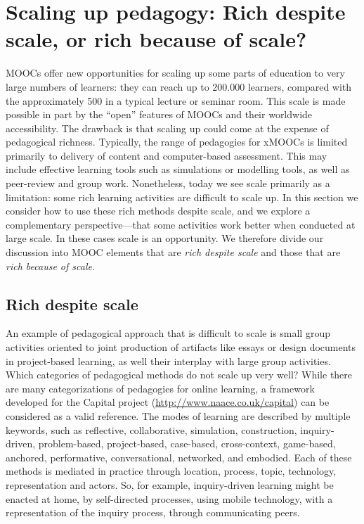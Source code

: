 \section{Scaling up pedagogy: Rich despite scale, or rich because of scale?}


MOOCs offer new opportunities for scaling up some parts of education to very large
numbers of learners:
they can reach up to 200.000 learners, compared with the approximately
500 in a typical lecture or seminar room.
This scale is made possible
in part by the ``open'' features of MOOCs and their worldwide
accessibility.
The drawback is that scaling up could come at the
expense of pedagogical richness. Typically, the range of pedagogies for
xMOOCs is limited primarily to delivery of content and computer-based
assessment. This may include effective learning tools such as
simulations or modelling tools, as well as peer-review and group
work. Nonetheless, today we see scale primarily as a limitation: some
rich learning 
activities are difficult to scale up. In this section we consider
how to use these rich methods despite scale, and we explore a
complementary perspective---that some activities work better when conducted at
large scale. In these cases scale is an opportunity.  We therefore
divide our discussion into MOOC elements that are \emph{rich despite
  scale} and those that are \emph{rich because of scale}.

\subsection{Rich despite scale}

An example of pedagogical approach that is difficult to scale is small
group activities oriented to joint production of artifacts like essays
or design documents in project-based learning, as well their interplay
with large group activities. Which categories of pedagogical methods do
not scale up very well? While there are many categorizations of
pedagogies for online learning, a framework developed for the Capital
project (\url{http://www.naace.co.uk/capital}) can be considered as a valid reference. The modes of learning
are described by multiple keywords, such as reflective, collaborative,
simulation, construction, inquiry-driven, problem-based, project-based,
case-based, cross-context, game-based, anchored, performative,
conversational, networked, and embodied. Each of these methods is
mediated in practice through location, process, topic, technology,
representation and actors. So, for example, inquiry-driven learning
might be enacted at home, by self-directed processes, using mobile technology,
with a representation of the
inquiry process, through communicating peers.

